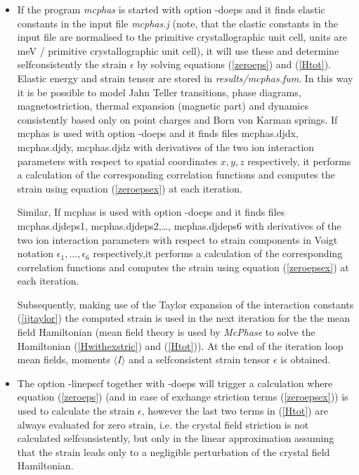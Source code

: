 \begin{itemize}
\item[{\prg -doeps}]
If the program {\em mcphas} is started with option {\prg -doeps}
and it finds elastic constants in the input file {\em mcphas.j} (note, that the elastic constants
in the input file are normalised to the primitive crystallographic unit cell, units are 
meV / primitive crystallographic unit cell), it
 will use these and determine selfconsistently the strain $\epsilon$ by solving equations
(\ref{zeroeps}) and (\ref{Htot}). Elastic energy and strain tensor are stored in {\em results/mcphas.fum}.
 In this way it is be possible to model Jahn Teller transitions,
phase diagrams, magnetostriction, thermal expansion (magnetic part) and dynamics consistently based
only on point charges and Born von Karman springs. 
If {\prg mcphas} is used with option {\prg -doeps} and 
it finds files {\prg mcphas.djdx}, {\prg mcphas.djdy}, {\prg mcphas.djdz} with
derivatives of the two ion interaction parameters with respect to
spatial coordinates $x,y,z$ respectively, it performs a calculation of
the corresponding correlation functions and computes the strain  using
equation (\ref{zeroepsex}) at each iteration. 

Similar, If {\prg mcphas} 
is used with option {\prg -doeps} and it finds files {\prg mcphas.djdeps1}, {\prg mcphas.djdeps2},\dots,
 {\prg mcphas.djdeps6} with
derivatives of the two ion interaction parameters with respect to
strain components in Voigt notation $\epsilon_1,\dots,\epsilon_6$ respectively,it performs a calculation of
the corresponding correlation functions and computes the strain  using
equation (\ref{zeroepsex}) at each iteration.

Subsequently, making use of the Taylor expansion
of the interaction constants (\ref{jjtaylor}) the computed strain is used 
in the next iteration for the the mean field Hamiltonian 
(mean field theory is used by {\em McPhase}
to solve the Hamiltonian (\ref{Hwithexstric}) and (\ref{Htot})). 
At the end of the iteration loop mean fields, moments $\langle I \rangle$ and 
a selfconsistent strain tensor $\epsilon$ is obtained. 
 
\item[{\prg -linepscf}]
The option {\prg -linepscf} together with {\prg -doeps} will trigger 
a calculation where equation (\ref{zeroeps}) (and in case
of exchange striction terms (\ref{zeroepsex}))
is used to calculate the strain $\epsilon$, however the last two terms in
(\ref{Htot}) are always evaluated
for zero strain, i.e. the crystal field striction is not calculated
selfconsistently, but only in the linear approximation assuming that the 
strain leads only to a negligible perturbation of the crystal field
Hamiltonian. 


\end{itemize}
